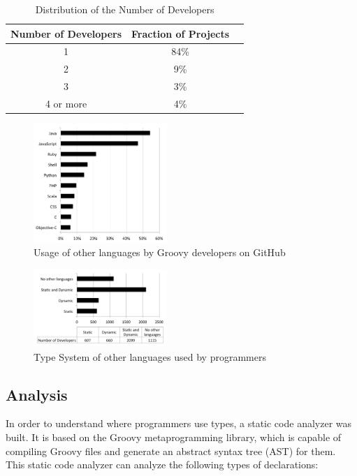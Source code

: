 \documentclass[preprint]{sigplanconf}
\begin{document}
\begin{table}[ht]
\caption{Distribution of the Number of Developers}
\centering{}%
\begin{tabular}{|c|c|c|}
\hline 
Number of Developers & Fraction of Projects\tabularnewline
\hline 
\hline 
1 & 84\%\tabularnewline
\hline 
2 & 9\%\tabularnewline
\hline 
3 & 3\%\tabularnewline
\hline 
4 or more & 4\%\tabularnewline
\hline 
\end{tabular}
\label{tab:number_of_developers}
\end{table}

\begin{figure}[ht]
\centering \includegraphics[width=0.45\textwidth]{images/other_languages}
\caption{Usage of other languages by Groovy developers on GitHub}
\label{fig:other_languages} 
\end{figure}

\begin{figure}[ht]
\centering \includegraphics[width=0.45\textwidth]{images/typeSystem_background}
\caption{Type System of other languages used by programmers}
\label{fig:typeSystem_background} 
\end{figure}



\subsection{Analysis\label{analyzer}}
In order to understand where programmers use types, a static code analyzer was built. 
It is based on the Groovy metaprogramming library, which is capable of compiling Groovy files and generate an abstract syntax tree (AST) for them.
This static code analyzer can analyze the following types of declarations:
\end{document}

